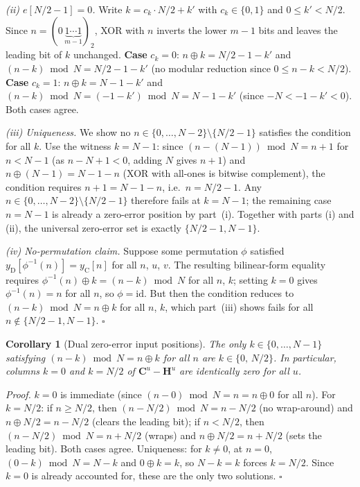 \documentclass[11pt]{article}
\newtheorem{corollary}[theorem]{Corollary}
\begin{document}
\smallskip
\noindent\textit{(ii) $e[N/2 - 1] = 0$.} Write $k = c_k\cdot N/2 + k'$ with $c_k\in\{0,1\}$ and $0\leq k'<N/2$. Since $n=(0\,\underbrace{1\cdots 1}_{m-1})_2$, XOR with $n$ inverts the lower $m-1$ bits and leaves the leading bit of $k$ unchanged. \textbf{Case} $c_k=0$: $n\oplus k = N/2-1-k'$ and $(n-k)\bmod N = N/2-1-k'$ (no modular reduction since $0\leq n-k < N/2$). \textbf{Case} $c_k=1$: $n\oplus k = N-1-k'$ and $(n-k)\bmod N = (-1-k')\bmod N = N-1-k'$ (since $-N<-1-k'<0$). Both cases agree.

\smallskip
\noindent\textit{(iii) Uniqueness.} We show no $n \in \{0,\ldots,N-2\}\setminus\{N/2-1\}$ satisfies the condition for all $k$. Use the witness $k = N-1$: since $(n-(N-1))\bmod N = n+1$ for $n < N-1$ (as $n-N+1<0$, adding $N$ gives $n+1$) and $n\oplus(N-1)=N-1-n$ (XOR with all-ones is bitwise complement), the condition requires $n+1 = N-1-n$, i.e.\ $n = N/2-1$. Any $n\in\{0,\ldots,N-2\}\setminus\{N/2-1\}$ therefore fails at $k=N-1$; the remaining case $n=N-1$ is already a zero-error position by part~(i). Together with parts (i) and (ii), the universal zero-error set is exactly $\{N/2-1,N-1\}$.

\smallskip
\noindent\textit{(iv) No-permutation claim.} Suppose some permutation $\phi$ satisfied $y_{\mathrm{D}}[\phi^{-1}(n)] = y_{\mathrm{C}}[n]$ for all $n$, $u$, $v$. The resulting bilinear-form equality requires $\phi^{-1}(n)\oplus k = (n-k)\bmod N$ for all $n$, $k$; setting $k=0$ gives $\phi^{-1}(n)=n$ for all $n$, so $\phi=\mathrm{id}$. But then the condition reduces to $(n-k)\bmod N = n\oplus k$ for all $n$, $k$, which part~(iii) shows fails for all $n\notin\{N/2-1,N-1\}$. $\square$

\medskip
\begin{corollary}[Dual zero-error input positions]\label{cor:dual-input}
The only $k \in \{0,\ldots,N-1\}$ satisfying $(n-k)\bmod N = n \oplus k$ for all $n$ are $k \in \{0,\,N/2\}$. In particular, columns $k=0$ and $k=N/2$ of $\mathbf{C}^u-\mathbf{H}^u$ are identically zero for all $u$.
\end{corollary}

\noindent\textit{Proof.} $k=0$ is immediate (since $(n-0)\bmod N = n = n\oplus 0$ for all $n$). For $k=N/2$: if $n \geq N/2$, then $(n-N/2)\bmod N = n-N/2$ (no wrap-around) and $n\oplus N/2 = n-N/2$ (clears the leading bit); if $n < N/2$, then $(n-N/2)\bmod N = n+N/2$ (wraps) and $n\oplus N/2 = n+N/2$ (sets the leading bit). Both cases agree. Uniqueness: for $k\neq 0$, at $n=0$, $(0-k)\bmod N = N-k$ and $0\oplus k = k$, so $N-k=k$ forces $k=N/2$. Since $k=0$ is already accounted for, these are the only two solutions. $\square$
\end{document}
